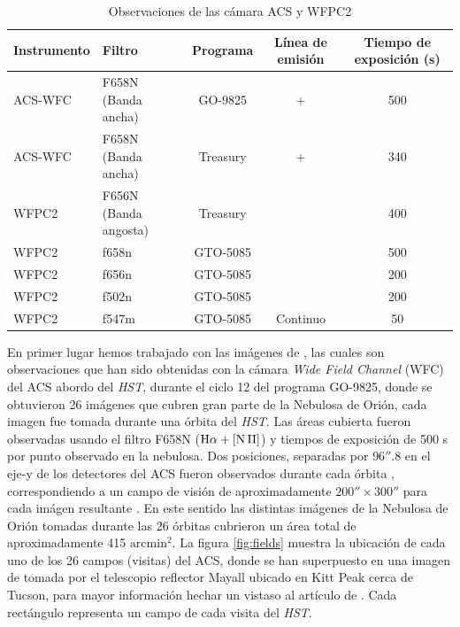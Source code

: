 \begin{table}
  \centering
  \small\raggedright
\renewcommand{\arraystretch}{1.5}
  \caption{Observaciones de las cámara ACS y WFPC2}\label{tab:instru}
  \begin{tabular}{l l c c c}
   \hline
   \hline
   Instrumento&      Filtro&      Programa&      Línea de emisión&     Tiempo de exposición (s)\\ \hline
   ACS-WFC&          F658N (Banda ancha)&       GO-9825&       \ha{} + \nii{}&       500\\ 
   ACS-WFC&          F658N (Banda ancha)&        Treasury&   \ha{} + \nii{}&        340\\ 
   WFPC2&            F656N (Banda angosta)&      Treasury&   \ha{}&      400\\
   WFPC2&            f658n&       GTO-5085&      \nii{}&               500\\
   WFPC2&            f656n&       GTO-5085&      \ha{}&                200\\
   WFPC2&            f502n&       GTO-5085&      \oiii{}&              200\\
   WFPC2&            f547m&       GTO-5085&      Continuo&             50\\ 
  \hline
  \end{tabular}
\end{table}
\normalsize

En primer lugar  hemos trabajado con las imágenes de \citet{Bally:2006a}, las cuales son observaciones que han sido obtenidas con la cámara \textit{Wide Field Channel} (WFC) del ACS abordo del \textit{HST}, durante el ciclo 12 del programa GO-9825, donde se obtuvieron 26 imágenes que cubren gran parte de la Nebulosa de Orión, cada imagen fue tomada durante una órbita del \textit{HST}. Las áreas cubierta fueron observadas usando el filtro F658N (\(\mathrm{H}\alpha+\mathrm{[N\,II]}\)) y tiempos de exposición de 500 s por punto observado en la nebulosa. Dos posiciones, separadas por \(96''.8\) en el eje-y de los detectores del ACS fueron observados durante cada órbita \citep{Bally:2006a}, correspondiendo a un campo de visión de aproximadamente \(200'' \times 300'' \) para cada imágen resultante \citep{Bally:2006a}. En este sentido las distintas imágenes de la Nebulosa de Orión tomadas durante las 26 órbitas cubrieron un área total de aproximadamente 415 \(\text{arcmin}^{2}\). La figura \ref{fig:fields} muestra la ubicación de cada uno de los 26 campos (visitas) del ACS, donde se han superpuesto en una imagen de \sii{} tomada por el telescopio reflector Mayall ubicado en Kitt Peak cerca de Tucson, para mayor información hechar un vistaso al artículo de \citet{Bally:2001a}. Cada rectángulo representa un campo de cada visita del \textit{HST}.\\

